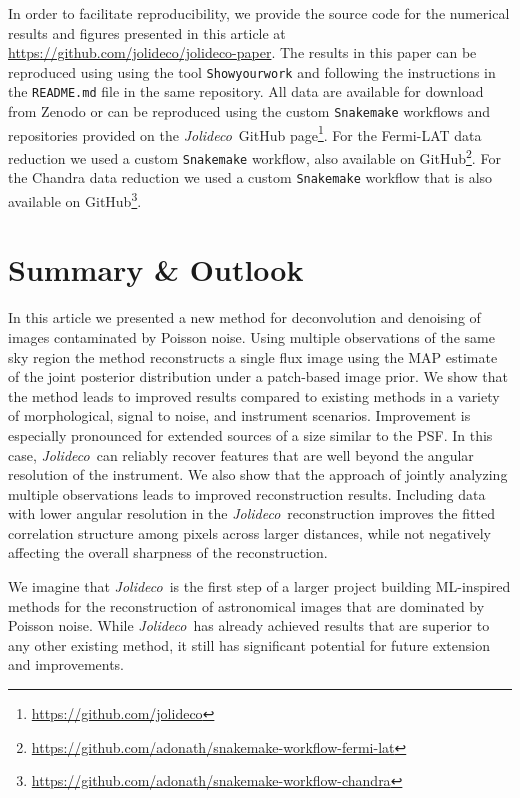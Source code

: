 \documentclass[twocolumn, linenumbers]{aastex631}
\newcommand{\jolideco}{\textit{Jolideco}~}
\begin{document}
    In order to facilitate reproducibility, we provide the source code for the numerical results
    and figures presented in this article at \url{https://github.com/jolideco/jolideco-paper}. The results in this paper can be reproduced using using the tool \texttt{Showyourwork} \citep{Luger2021} and following the instructions in the \texttt{README.md} file in the same repository. All data are available for download from Zenodo or can be reproduced using the custom  \texttt{Snakemake} workflows and repositories provided on the \jolideco GitHub page\footnote{\url{https://github.com/jolideco}}. For the Fermi-LAT data reduction we used a custom \texttt{Snakemake} workflow, also  available on GitHub\footnote{\url{https://github.com/adonath/snakemake-workflow-fermi-lat}}. For the Chandra data reduction we used a custom \texttt{Snakemake} workflow that is also available on GitHub\footnote{\url{https://github.com/adonath/snakemake-workflow-chandra}}.

            
    
    \section{Summary \& Outlook}
    In this article we presented a new method for deconvolution and denoising of images contaminated by Poisson noise. Using multiple observations of the same sky region the method reconstructs a single flux image using the MAP estimate of the joint posterior distribution under a patch-based image prior. We show that the method leads to improved results compared to existing methods in a variety of morphological, signal to noise, and instrument scenarios. Improvement is especially pronounced for extended sources of a size similar to the PSF. In this case, \jolideco can reliably recover features that are well beyond the angular resolution of the instrument. We also show that the approach of jointly analyzing multiple observations leads to improved reconstruction results. Including data with lower angular resolution in the \jolideco reconstruction improves the fitted correlation structure among pixels across larger distances, while not negatively affecting the overall sharpness of the reconstruction.

    We imagine that \jolideco is the first step of a larger project building ML-inspired methods for the reconstruction of astronomical images that are dominated by Poisson noise. While \jolideco has already achieved results that are superior to any other existing method, it still has significant potential for future extension and improvements.
    
\end{document}
